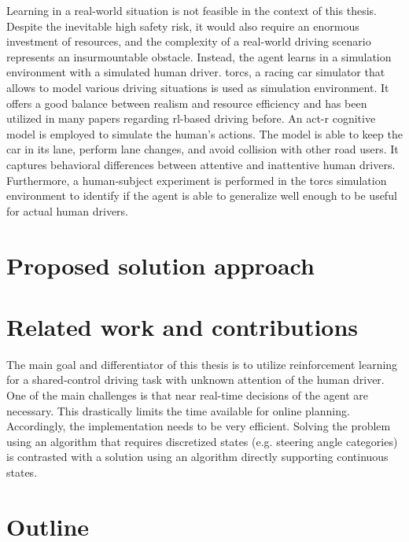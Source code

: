 Learning in a real-world situation is not feasible in the context of this thesis. Despite the inevitable high safety risk, it would also require an enormous investment of resources, and the complexity of a real-world driving scenario represents an insurmountable obstacle. Instead, the agent learns in a simulation environment with a simulated human driver. \gls{torcs}, a racing car simulator that allows to model various driving situations \parencite{torcs} is used as simulation environment. It offers a good balance between realism and resource efficiency and has been utilized in many papers regarding \gls{rl}-based driving before. An \gls{act-r} cognitive model is employed to simulate the human's actions. The model is able to keep the car in its lane, perform lane changes, and avoid collision with other road users. It captures behavioral differences between attentive and inattentive human drivers. Furthermore, a human-subject experiment is performed in the \gls{torcs} simulation environment to identify if the agent is able to generalize well enough to be useful for actual human drivers.

\section{Proposed solution approach}

\section{Related work and contributions}


The main goal and differentiator of this thesis is to utilize reinforcement learning for a shared-control driving task with unknown attention of the human driver. One of the main challenges is that near real-time decisions of the agent are necessary. This drastically limits the time available for online planning. Accordingly, the implementation needs to be very efficient. Solving the problem using an algorithm that requires discretized states (e.g. steering angle categories) is contrasted with a solution using an algorithm directly supporting continuous states.


\section{Outline}

